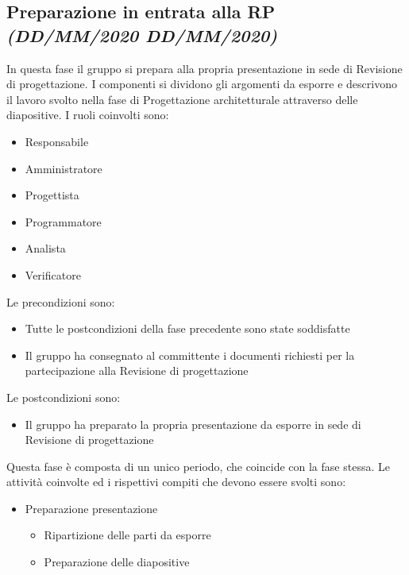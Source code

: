 \documentclass[../piano-di-progetto.tex]{subfiles}
\begin{document}
\subsection[Preparazione in entrata alla RP]{Preparazione in entrata alla RP {\normalsize\normalfont\itshape(DD/MM/2020  DD/MM/2020)}}%
\label{sub:preparazione_in_entrata_alla_rp}
In questa fase il gruppo si prepara alla propria presentazione in sede di Revisione di progettazione.
I componenti si dividono gli argomenti da esporre e descrivono il lavoro svolto nella fase di Progettazione architetturale attraverso delle diapositive.
I ruoli coinvolti sono:
\begin{itemize}
  \item Responsabile
  \item Amministratore
  \item Progettista
  \item Programmatore
  \item Analista
  \item Verificatore
\end{itemize}
Le precondizioni sono:
\begin{itemize}
  \item Tutte le postcondizioni della fase precedente sono state soddisfatte
  \item Il gruppo ha consegnato al committente i documenti richiesti per la partecipazione alla Revisione di progettazione
\end{itemize}
Le postcondizioni sono:
\begin{itemize}
  \item Il gruppo ha preparato la propria presentazione da esporre in sede di Revisione di progettazione
\end{itemize}
Questa fase è composta di un unico periodo, che coincide con la fase stessa.
Le attività coinvolte ed i rispettivi compiti che devono essere svolti sono:
\begin{itemize}
  \item Preparazione presentazione
  \begin{itemize}
    \item Ripartizione delle parti da esporre
    \item Preparazione delle diapositive
  \end{itemize}
\end{itemize}
\end{document}
